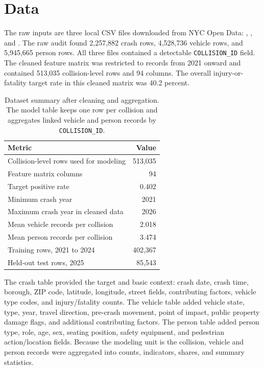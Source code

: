 \documentclass{article}
\begin{document}
\section{Data}
The raw inputs are three local CSV files downloaded from NYC Open Data: , , and . The raw audit found 2,257,882 crash rows, 4,528,736 vehicle rows, and 5,945,665 person rows. All three files contained a detectable \texttt{COLLISION\_ID} field. The cleaned feature matrix was restricted to records from 2021 onward and contained 513,035 collision-level rows and 94 columns. The overall injury-or-fatality target rate in this cleaned matrix was 40.2 percent.

\begin{table}[H]
\centering
\caption{Dataset summary after cleaning and aggregation. The model table keeps one row per collision and aggregates linked vehicle and person records by \texttt{COLLISION\_ID}.}
\small
\begin{tabular}{lr}
\toprule
Metric & Value \\
\midrule
Collision-level rows used for modeling & 513,035 \\
Feature matrix columns & 94 \\
Target positive rate & 0.402 \\
Minimum crash year & 2021 \\
Maximum crash year in cleaned data & 2026 \\
Mean vehicle records per collision & 2.018 \\
Mean person records per collision & 3.474 \\
Training rows, 2021 to 2024 & 402,367 \\
Held-out test rows, 2025 & 85,543 \\
\bottomrule
\end{tabular}
\end{table}

The crash table provided the target and basic context: crash date, crash time, borough, ZIP code, latitude, longitude, street fields, contributing factors, vehicle type codes, and injury/fatality counts. The vehicle table added vehicle state, type, year, travel direction, pre-crash movement, point of impact, public property damage flags, and additional contributing factors. The person table added person type, role, age, sex, seating position, safety equipment, and pedestrian action/location fields. Because the modeling unit is the collision, vehicle and person records were aggregated into counts, indicators, shares, and summary statistics.
\end{document}
